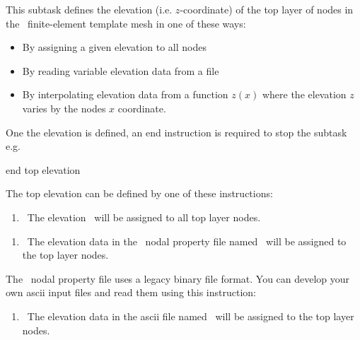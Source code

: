     {This subtask defines the elevation (i.e. $z$-coordinate) of the top layer of nodes in the \gwf\ finite-element template mesh in one of these ways:
     \begin{itemize}
        \item By assigning a given elevation to all nodes
        \item By reading variable elevation data from a file
        \item By interpolating elevation data from a function $z(x)$ where the elevation $z$ varies by the nodes $x$ coordinate.
     \end{itemize}
     One the elevation is defined, an \textsf{end} instruction is required to stop the subtask e.g.\:

    {\Large \sf end top elevation}
    }

 The top elevation can be defined by one of these instructions: \label{'Page:TopElev'}

    {\squish
    \begin{enumerate}
    \item {}\  The elevation \ will be assigned to all top layer nodes.
    \end{enumerate}
    \squish
    }

    {\squish
    \begin{enumerate}
    \item {}\  The elevation data in the \gb\ nodal property file named \ will be assigned to the top layer nodes.
    \end{enumerate}
    \squish
    }

The \gb\ nodal property file uses a legacy binary file format. You can develop your own ascii input files and read them using this instruction:

    {\squish
    \begin{enumerate}
    \item {}\  The elevation data in the ascii file named  \ will be assigned to the top layer nodes.
    \end{enumerate}
    \squish
    }

